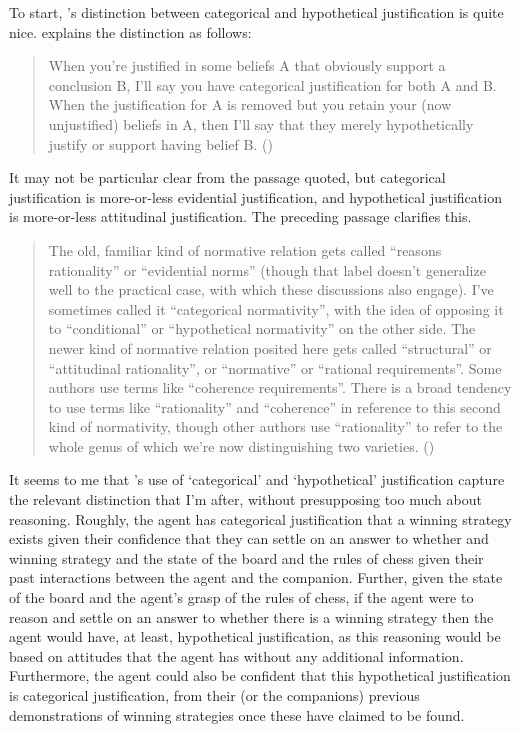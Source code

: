 \documentclass[10pt]{article}
\begin{document}
To start, \citeauthor{Pryor:2018aa}'s distinction between categorical and hypothetical justification is quite nice.
\citeauthor{Pryor:2018aa} explains the distinction as follows:

\begin{quote}
  When you're justified in some beliefs A that obviously support a conclusion B, I'll say you have categorical justification for both A and B.
  When the justification for A is removed but you retain your (now unjustified) beliefs in A, then I'll say that they merely hypothetically justify or support having belief B.\nolinebreak
  \mbox{}\hfill\mbox{(\citeauthor[126]{Pryor:2018aa})}
\end{quote}

It may not be particular clear from the passage quoted, but categorical justification is more-or-less evidential justification, and hypothetical justification is more-or-less attitudinal justification.
The preceding passage clarifies this.

\begin{quote}
  The old, familiar kind of normative relation gets called ``reasons rationality'' or ``evidential norms'' (though that label doesn’t generalize well to the practical case, with which these discussions also engage).
  I've sometimes called it ``categorical normativity'', with the idea of opposing it to ``conditional'' or ``hypothetical normativity'' on the other side.
  The newer kind of normative relation posited here gets called ``structural'' or ``attitudinal rationality'', or ``normative'' or ``rational requirements''.
  Some authors use terms like ``coherence requirements''.
  There is a broad tendency to use terms like ``rationality'' and ``coherence'' in reference to this second kind of normativity, though other authors use ``rationality'' to refer to the whole genus of which we’re now distinguishing two varieties.\nolinebreak
  \mbox{}\hfill\mbox{(\citeauthor[126]{Pryor:2018aa})}
\end{quote}

It seems to me that \citeauthor{Pryor:2018aa}'s use of `categorical' and `hypothetical' justification capture the relevant distinction that I'm after, without presupposing too much about reasoning.
Roughly, the agent has categorical justification that a winning strategy exists given their confidence that they can settle on an answer to whether and winning strategy and the state of the board and the rules of chess given their past interactions between the agent and the companion.
Further, given the state of the board and the agent's grasp of the rules of chess, if the agent were to reason and settle on an answer to whether there is a winning strategy then the agent would have, at least, hypothetical justification, as this reasoning would be based on attitudes that the agent has without any additional information.
Furthermore, the agent could also be confident that this hypothetical justification is categorical justification, from their (or the companions) previous demonstrations of winning strategies once these have claimed to be found.
\end{document}

